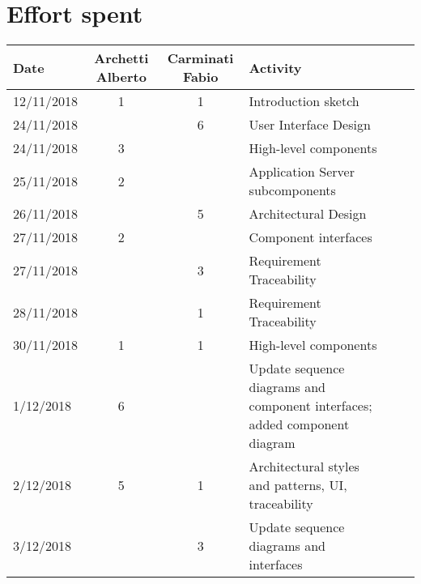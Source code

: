 \documentclass[../DD0.tex]{subfiles}
\newcommand{\addHours}[4]{#1 & #2 & #3 & #4 \\\hline}
\begin{document}
\section*{Effort spent}
\label{sec:effort}
  \begin{table}[h!]
  \centering
  \begin{tabularx}{\linewidth}{|l|c|c|X|Xl}
    \hline
    \textbf{Date}  & \textbf{Archetti Alberto} & \textbf{Carminati Fabio} & \textbf{Activity} \\ \hline
    \addHours{12/11/2018}{1}{1}{Introduction sketch}
    \addHours{24/11/2018}{}{6}{User Interface Design}
    \addHours{24/11/2018}{3}{}{High-level components}
    \addHours{25/11/2018}{2}{}{Application Server subcomponents}
    \addHours{26/11/2018}{}{5}{Architectural Design}
    \addHours{27/11/2018}{2}{}{Component interfaces}
    \addHours{27/11/2018}{}{3}{Requirement Traceability}
    \addHours{28/11/2018}{}{1}{Requirement Traceability}
    \addHours{30/11/2018}{1}{1}{High-level components}
    \addHours{1/12/2018}{6}{}{Update sequence diagrams and component interfaces; added component diagram}
    \addHours{2/12/2018}{5}{1}{Architectural styles and patterns, UI, traceability}
    \addHours{3/12/2018}{}{3}{Update sequence diagrams and interfaces}
  \end{tabularx}
\end{table}
\end{document}
